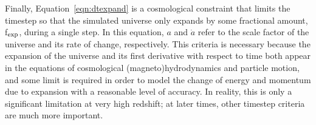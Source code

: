 Finally, Equation~\ref{eqn:dtexpand} is a cosmological constraint that
limits the timestep so that the simulated universe only expands by
some fractional amount, f$_{\rm exp}$, during a single step.  In this
equation, $a$ and $\dot{a}$ refer to the scale factor of the universe
and its rate of change, respectively.  This
criteria is necessary because the expansion of the universe and its
first derivative with respect to time both appear in the equations of cosmological (magneto)hydrodynamics and particle motion,
and some limit is required in order to model the change of energy and
momentum due to expansion with a reasonable level of accuracy.  In
reality, this is only a significant limitation at very high redshift;
at later times, other timestep criteria are much more important.

